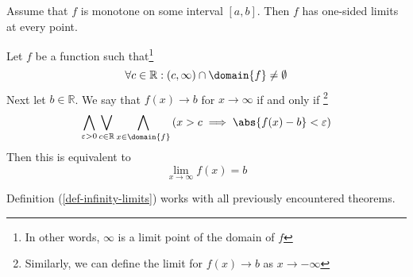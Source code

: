 \begin{thm}\label{thm-monotone-one-sided-limits}
	Assume that $f$ is monotone on some interval $[a,b]$. Then $f$ has one-sided
	limits at every point.
\end{thm}

\begin{definition}\label{def-infinity-limits}
	Let $f$ be a function such that\footnote{In other words, $\infty$ is a limit
		point of the domain of $f$}
	\begin{equation}
		\forall c\in\mathbb{R}: (c,\infty)\cap\domain{f}\neq\emptyset
	\end{equation}
	Next let $b\in\mathbb{R}$. We say that $f(x) \to b$ for $x \to \infty$ if and only if
	\footnote{Similarly, we can define the limit for $f(x) \to b$ as $x \to -\infty$}
	\begin{equation}
		\bigwedge_{\varepsilon>0}\bigvee_{c\in\mathbb{R}}\bigwedge_{x\in\domain{f}}
		\left(x>c \implies \abs{f(x) - b}<\varepsilon\right)
	\end{equation}
	Then this is equivalent to \cite[p.70]{wuest2009}
	\begin{equation}
		\lim_{x \to \infty}f(x)=b
	\end{equation}
\end{definition}

\begin{rem}
	Definition (\ref{def-infinity-limits}) works with all previously encountered theorems.
\end{rem}

